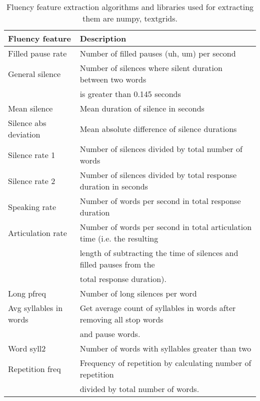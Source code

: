 \documentclass[sigconf]{acmart}
\begin{document}
\begin{table*}[]
\begin{tabular}{@{}|l|l|@{}}  \toprule
\textbf{Fluency feature} & \textbf{Description}\\ \midrule \midrule
Filled pause rate & Number of filled pauses (uh, um) per second 
\cite{parselmouth,praat}\\ \midrule
General silence & Number of silences where silent duration between two words \\ & is greater than 0.145 seconds \\ \midrule
Mean silence & Mean duration of silence in seconds \\ \midrule
Silence abs deviation & Mean absolute difference of silence durations \\ \midrule
Silence rate 1 & Number of silences divided by total number of words\\ \midrule
Silence rate 2 & Number of silences divided by total response duration in seconds \\ \midrule
Speaking rate & Number of words per second in total response duration\\ \midrule
Articulation rate & Number of words per second in total articulation time 
                                   (i.e. the resulting \\ & length of subtracting the time of silences and filled pauses 
                                   from the \\ & total response duration).\\ \midrule
Long pfreq & Number of long silences per word\\ \midrule
Avg syllables in words & Get average count of syllables in words after removing
                                                    all stop words\\ & and pause words.\\ \midrule
Word syll2 & Number of words with syllables greater than two\\ \midrule
Repetition freq & Frequency of repetition by calculating number of repetition\\ & divided by total number of words.\\
\bottomrule
\end{tabular}
\caption{ \label{table: fluency feature extraction}Fluency feature extraction algorithms and libraries used for extracting them are numpy, textgrids.
}
\end{table*}
\end{document}

